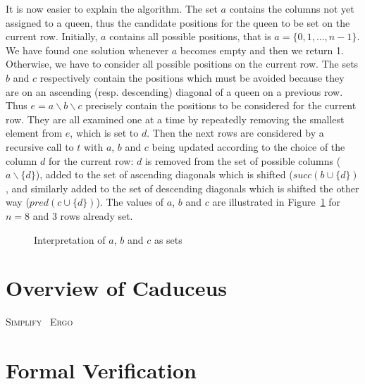 \documentclass[a4paper]{llncs}
\newcommand{\caduceus}{\textsc{Caduceus}}
\newcommand{\simplify}{\textsc{Simplify}}
\newcommand{\ergo}{\textsc{Ergo}}
\begin{document}
It is now easier to explain the algorithm. The set $a$ contains the
columns not yet assigned to a queen, thus the candidate positions
for the queen to be set on the current row. Initially, $a$ contains
all possible positions, that is  $a = \{0,1,\dots,n-1\}$. 
We have found one solution whenever $a$ becomes empty and then we return 1.
Otherwise, we have to consider all possible positions on the current
row. The sets $b$ and $c$ respectively contain the positions which
must be avoided because they are on an ascending (resp. descending)
diagonal of a queen on a previous row.
Thus $e = a\backslash b\backslash c$ precisely contain the positions to be
considered for the current row. They are all examined one at a time by
repeatedly removing the smallest element from $e$, which is set to $d$.
Then the next rows are considered by a recursive call to $t$ with $a$,
$b$ and $c$ being updated according to the choice of the column $d$
for the current row: $d$ is removed from the set of possible columns
($a\backslash\{d\}$), added to the set of ascending diagonals which is
shifted ($\mathit{succ}(b\cup\{d\})$, and similarly  added to the set of
descending diagonals which is shifted the other way
($\mathit{pred}(c\cup\{d\})$). 
The values of $a$, $b$ and $c$ are illustrated in Figure~\ref{fig:abc}
for $n=8$ and 3 rows already set.

\begin{figure}
  \hspace*{-3em}
  \caption{Interpretation of $a$, $b$ and $c$ as sets}
  \label{fig:abc}
\end{figure}

\section{Overview of Caduceus}\label{caduceus}

\cite{caduceus,FilliatreMarche04} \cite{why}

\simplify~\cite{simplify} \cite{yices} \ergo~\cite{ergo} \cite{coq}


\section{Formal Verification}\label{verif}
\end{document}
